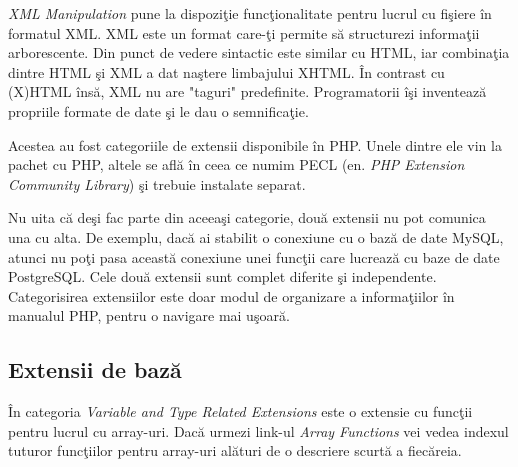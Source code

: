 \textit{XML Manipulation} pune la dispoziţie funcţionalitate
pentru lucrul cu fişiere în formatul XML. XML este un format
care-ţi permite să structurezi informaţii arborescente. Din punct
de vedere sintactic este
similar cu HTML, iar combinaţia dintre HTML şi XML a dat naştere
limbajului XHTML. În contrast cu (X)HTML însă, XML nu are
"taguri" predefinite. Programatorii îşi inventează
propriile formate de date şi le dau o semnificaţie.

Acestea au fost categoriile de extensii disponibile în PHP.
Unele dintre ele vin la pachet cu PHP, altele se află
în ceea ce numim PECL (en. \textsl{PHP Extension Community Library})
şi trebuie instalate separat.

Nu uita că deşi fac parte din aceeaşi categorie, două extensii nu
pot comunica una cu alta. De exemplu, dacă ai stabilit o conexiune
cu o bază de date MySQL, atunci nu poţi pasa această conexiune
unei funcţii care lucrează cu baze de date PostgreSQL. Cele două
extensii sunt complet diferite şi independente. Categorisirea
extensiilor este doar modul de organizare a informaţiilor în
manualul PHP, pentru o navigare mai uşoară.


\subsection{Extensii de bază}
În categoria \textit{Variable and Type Related Extensions}
este o extensie cu funcţii pentru lucrul cu array-uri.
Dacă urmezi link-ul \textit{Array Functions} vei vedea
indexul tuturor funcţiilor pentru array-uri alături de
o descriere scurtă a fiecăreia.

